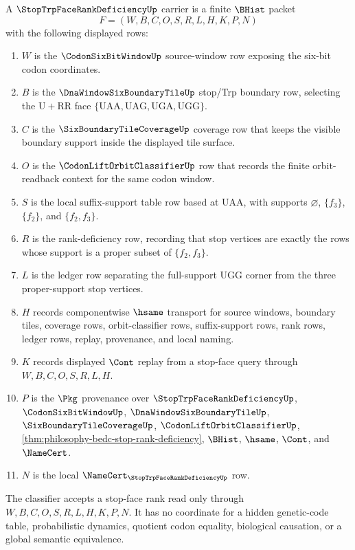 \begin{definition}
\label{def:stop-trp-face-rank-deficiency-carrier}
A $\StopTrpFaceRankDeficiencyUp$ carrier is a finite $\BHist$ packet
$$
F=(W,B,C,O,S,R,L,H,K,P,N)
$$
with the following displayed rows:
\begin{enumerate}
\item $W$ is the $\CodonSixBitWindowUp$ source-window row exposing the
six-bit codon coordinates.
\item $B$ is the $\DnaWindowSixBoundaryTileUp$ stop/Trp boundary row,
selecting the $\mathrm{U}+\mathrm{RR}$ face
$\{\mathrm{UAA},\mathrm{UAG},\mathrm{UGA},\mathrm{UGG}\}$.
\item $C$ is the $\SixBoundaryTileCoverageUp$ coverage row that keeps the
visible boundary support inside the displayed tile surface.
\item $O$ is the $\CodonLiftOrbitClassifierUp$ row that records the finite
orbit-readback context for the same codon window.
\item $S$ is the local suffix-support table row based at $\mathrm{UAA}$,
with supports $\varnothing$, $\{f_3\}$, $\{f_2\}$, and
$\{f_2,f_3\}$.
\item $R$ is the rank-deficiency row, recording that stop vertices are
exactly the rows whose support is a proper subset of $\{f_2,f_3\}$.
\item $L$ is the ledger row separating the full-support $\mathrm{UGG}$ corner
from the three proper-support stop vertices.
\item $H$ records componentwise $\hsame$ transport for source windows,
boundary tiles, coverage rows, orbit-classifier rows, suffix-support rows,
rank rows, ledger rows, replay, provenance, and local naming.
\item $K$ records displayed $\Cont$ replay from a stop-face query through
$W,B,C,O,S,R,L,H$.
\item $P$ is the $\Pkg$ provenance over $\StopTrpFaceRankDeficiencyUp$,
$\CodonSixBitWindowUp$, $\DnaWindowSixBoundaryTileUp$,
$\SixBoundaryTileCoverageUp$, $\CodonLiftOrbitClassifierUp$,
\autoref{thm:philosophy-bedc-stop-rank-deficiency}, $\BHist$, $\hsame$,
$\Cont$, and $\NameCert$.
\item $N$ is the local $\NameCert_{\StopTrpFaceRankDeficiencyUp}$ row.
\end{enumerate}
The classifier accepts a stop-face rank read only through
$W,B,C,O,S,R,L,H,K,P,N$. It has no coordinate for a hidden genetic-code table,
probabilistic dynamics, quotient codon equality, biological causation, or a
global semantic equivalence.
\end{definition}

